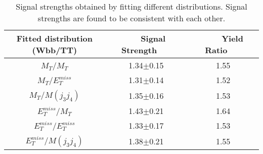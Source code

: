 \begin{table}[!htb]
\begin{center}
   \begin{tabular} {ccc} \hline\hline
   Fitted distribution (Wbb/TT) & ~~~Signal Strength~~~ & ~~~~Yield Ratio~~~ \\
        \hline
        $M_T$/$M_T$                     &1.34$\pm$0.15  &1.55\\
        $M_T$/$E^{miss}_T$              &1.31$\pm$0.14  &1.52\\
        $M_T$/$M(j_3j_4)$               &1.35$\pm$0.16  &1.53\\
        $E^{miss}_T$/$M_T$              &1.43$\pm$0.21  &1.64\\
        $E^{miss}_T$/$E^{miss}_T$       &1.33$\pm$0.17  &1.53\\
        $E^{miss}_T$/$M(j_3j_4)$        &1.38$\pm$0.21  &1.55\\
   \hline\hline
   \end{tabular}
                                                                                                                                                                                                 \caption{Signal strengths obtained by fitting different distributions. Signal strengths are found to be consistent with each other.}
\label{tab:addFitTest}
\end{center}
\end{table}



       
